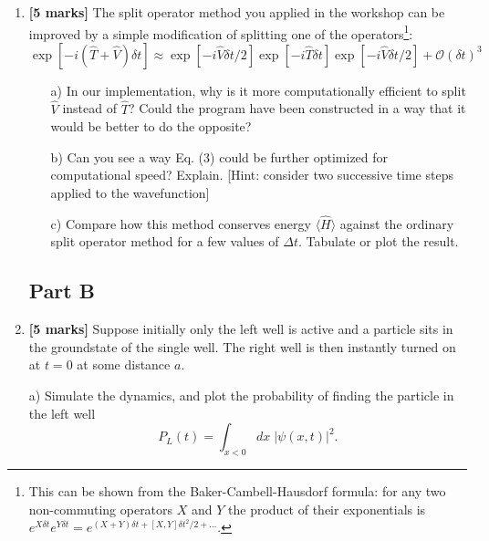 \documentclass[11pt]{article}
\begin{document}
\begin{enumerate}
\item \textbf{[5 marks]}  The split operator method you applied in the workshop can be improved by a simple modification of splitting one of the operators\footnote{This can be shown from the Baker-Cambell-Hausdorf formula: for any two non-commuting operators $X$ and $Y$ the product of their exponentials is  $e^{X\delta t }e^{Y\delta t} = e^{(X+ Y)\delta t + [X,Y]\delta t^2 /2 + \dots }$. }:
\begin{equation}
\exp\left[- i (\hat T + \hat V) \delta t  \right] \approx \exp \left[ - i \hat V \delta t/2  \right] \exp \left[ - i \hat T \delta t  \right] \exp \left[ - i \hat V \delta t/2  \right]  + \mathcal{O}(\delta t)^3
\end{equation}
\begin{itemize}
\item[a)] In our implementation, why is it more computationally efficient to split $\hat V$ instead of $\hat T$?  Could the program have been constructed in a way that it would be better to do the opposite?
\item[b)]  Can you see a way Eq. (3) could be further optimized for computational speed? Explain. [Hint: consider two successive time steps applied to the wavefunction]
\item[c)]  Compare how this method conserves energy $\langle \hat H \rangle$ against the ordinary split operator method for a few values of $\Delta t$. Tabulate or plot the result.
\end{itemize}

\pagebreak
\subsection*{Part B}
\item \textbf{[5 marks]}  Suppose  initially only the left well is  active and a particle sits in the groundstate of the single well. The right well is then instantly turned on at $t=0$ at some distance $a$. 

\item [a)] Simulate the dynamics, and plot the probability of finding the particle in the left well
\begin{equation}
P_L(t) = \int_{x<0} dx\;    |\psi(x,t)|^2.
\end{equation} 


\end{enumerate}
\end{document}

